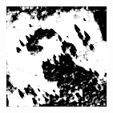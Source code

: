 \documentclass[usenames,dvipsnames,10pt]{beamer}
\begin{document}
\begin{frame}
\begin{minipage}[]{0.3\textwidth}
	\includegraphics[width=\textwidth]{graphics/tfcn-output-07.jpg}
\end{minipage}
\end{frame}
\end{document}
